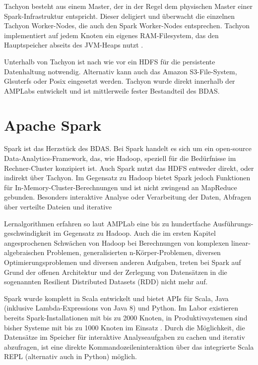 Tachyon besteht aus einem Master, der in der Regel dem physischen Master einer Spark-Infrastruktur entspricht. Dieser deligiert und überwacht die einzelnen Tachyon Worker-Nodes, die auch den Spark Worker-Nodes entsprechen. Tachyon implementiert auf jedem Knoten ein eigenes RAM-Filesystem, das den Hauptspeicher abseits des JVM-Heaps nutzt .

Unterhalb von Tachyon ist nach wie vor ein HDFS für die persistente Datenhaltung notwendig. Alternativ kann auch das Amazon S3-File-System, Glsuterfs oder Posix eingesetzt werden. Tachyon wurde direkt innerhalb der AMPLabs entwickelt und ist mittlerweile fester Bestandteil des BDAS.  


\section{Apache Spark}
\label{section:apache Spark}

Spark ist das Herzstück des BDAS. Bei Spark handelt es sich um ein open-source Data-Analytics-Framework, das, wie Hadoop, speziell für die Bedürfnisse im Rechner-Cluster konzipiert ist. Auch Spark nutzt das HDFS entweder direkt, oder indirekt über Tachyon. Im Gegensatz zu Hadoop bietet Spark jedoch Funktionen für In-Memory-Cluster-Berechnungen und ist nicht zwingend an MapReduce gebunden. Besonders interaktive Analyse oder Verarbeitung der Daten, Abfragen über verteilte Dateien und iterative 

Lernalgorithmen erfahren so laut AMPLab eine bis zu hundertfache Ausführungs-geschwindigkeit im Gegensatz zu Hadoop. Auch die im ersten Kapitel angesprochenen Schwächen von Hadoop bei Berechnungen von komplexen linear-algebraischen Problemen, generalisierten n-Körper-Problemen, diversen Optimierungsproblemen und diversen anderen Aufgaben, treten bei Spark auf Grund der offenen Architektur und der Zerlegung von Datensätzen in die sogenannten Resilient Distributed Datasets (RDD) nicht mehr auf.

Spark wurde komplett in Scala entwickelt und bietet APIs für Scala, Java (inklusive Lambda-Expressions von Java 8) und Python. Im Labor existieren bereits Spark-Installationen mit bis zu 2000 Knoten, in Produktivsystemen sind bisher Systeme mit bis zu 1000 Knoten im Einsatz . Durch die Möglichkeit, die Datensätze im Speicher für interaktive Analyseaufgaben zu cachen und iterativ abzufragen, ist eine direkte Kommandozeileninteraktion über das integrierte Scala REPL (alternativ auch in Python) möglich. 

